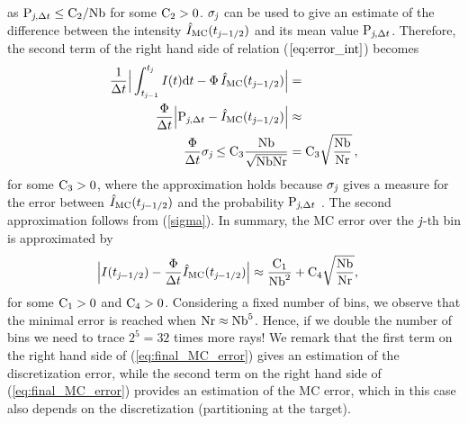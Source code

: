  as $\textrm{P}_{\textit{j}, \Delta t}\leq \textrm{C}_{2}/\textrm{Nb}$ for some $\textrm{C}_{2}>0$. $\sigma_{\textit{j}}$ can be used to give an estimate of the difference between the intensity $\hat{I}_{\textrm{MC}}(t_{\textit{j}-1/2})$ and its mean value $\textrm{P}_{\textit{j}, \Delta t}$.
Therefore, the second term of the right hand side of relation ($\ref{eq:error_int}$) becomes
\begin{equation}\begin{aligned}
\frac{1}{\Delta t}\Big|\int_{t_{\textit{j}-1}}^{t_{\textit{j}}} I(t)\textrm{d}t -
\Phi\, \hat{I}_{\textrm{MC}}(t_{\textit{j}-1/2})\Big| &=  \\
\frac{\Phi}{\Delta t}\Big|\textrm{P}_{\textit{j}, \Delta t} -\hat{I}_{\textrm{MC}}(t_{\textit{j}-1/2})\Big| &\approx  \\
  \frac{\Phi}{\Delta t}
\sigma_{\textit{j}}\leq\textrm{C}_3\frac{\textrm{Nb}}{\sqrt{\textrm{Nb}\textrm{Nr}}} & = \textrm{C}_3\sqrt{\frac{\textrm{Nb}}{\textrm{Nr}}}\,,
\end{aligned}
\end{equation}
for some $\textrm{C}_3>0$, where the approximation holds because $\sigma_{\textit{j}}$ gives a measure for the error between
$\hat{I}_{\textrm{MC}}(t_{\textit{j}-1/2})$ and the probability $\textrm{P}_{\textit{j}, \Delta t}$ \cite{diez2012openintro}. The second approximation follows from (\ref{sigma}). In summary, the MC error over the $\textit{j}$-th bin is approximated by
\begin{equation}\begin{aligned}
\Big|I(t_{\textit{j}-1/2})&-\frac{\Phi}
{\Delta t}\hat{I}_{\textrm{MC}}(t_{\textit{j}-1/2})\Big| \approx
\frac{\textrm{C}_1}{\textrm{Nb}^2} + \textrm{C}_4\sqrt{\frac{\textrm{Nb}}{\textrm{Nr}}},
\end{aligned}
\label{eq:final_MC_error}
\end{equation}
for some $\textrm{C}_1>0$ and $\textrm{C}_4>0$. 
Considering a fixed number of bins, we observe that the minimal error is reached when $\textrm{Nr}\approx \textrm{Nb}^5$.
Hence, if we double the number of bins we need to trace $2^5 = 32$ times more rays!
We remark that the first term on the right hand side of (\ref{eq:final_MC_error}) gives an estimation of the discretization error, while the second term on the right hand side of (\ref{eq:final_MC_error}) provides an estimation of the MC error, which in this case also depends on the discretization (partitioning at the target). 
